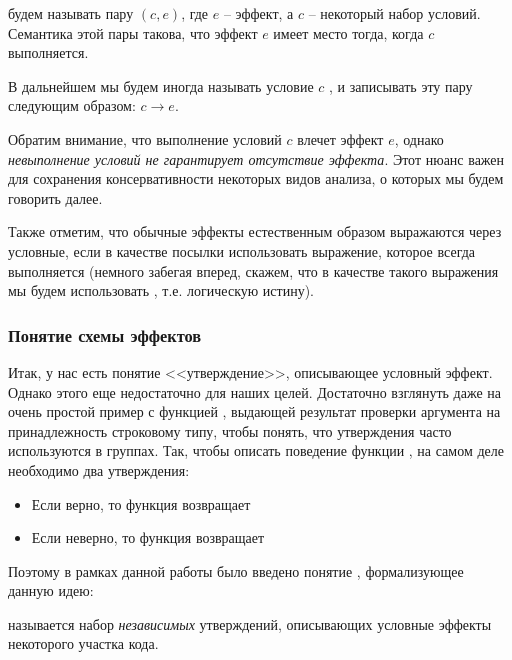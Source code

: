 \begin{definition}
    \label{def-cond-effect}
     будем называть пару $(c, e)$, где $e$ -- эффект, а $c$ -- некоторый набор условий. Семантика этой пары такова, что эффект $e$ имеет место тогда, когда $c$ выполняется.  
    
    В дальнейшем мы будем иногда называть условие $c$ , и записывать эту пару следующим образом: $c \to e$.
   
\end{definition}

Обратим внимание, что выполнение условий $c$ влечет эффект $e$, однако \emph{невыполнение условий не гарантирует отсутствие эффекта}. Этот нюанс важен для сохранения консервативности некоторых видов анализа, о которых мы будем говорить далее.

Также отметим, что обычные эффекты естественным образом выражаются через условные, если в качестве посылки использовать выражение, которое всегда выполняется (немного забегая вперед, скажем, что в качестве такого выражения мы будем использовать , т.е. логическую истину).



\subsubsection{Понятие схемы эффектов}


Итак, у нас есть понятие <<утверждение>>, описывающее условный эффект. Однако этого еще недостаточно для наших целей. Достаточно взглянуть даже на очень простой пример с функцией , выдающей результат проверки аргумента на принадлежность строковому типу, чтобы понять, что утверждения часто используются в группах. Так, чтобы описать поведение функции , на самом деле необходимо два утверждения:

\begin{itemize}
    \item Если  верно, то функция возвращает 
    
    \item Если  неверно, то функция возвращает 
\end{itemize}

Поэтому в рамках данной работы было введено понятие , формализующее данную идею:

\begin{definition}
     называется набор \emph{независимых} утверждений, описывающих условные эффекты некоторого участка кода.
\end{definition}

